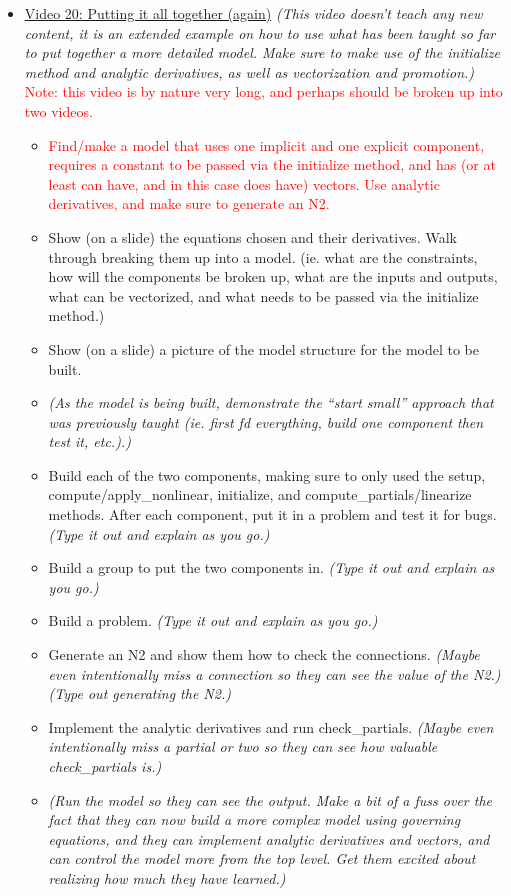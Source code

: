 \documentclass[12pt, letterpaper]{article}
\begin{document}
\begin{itemize}
	\item \underline{Video 20: Putting it all together (again)} \textit{(This video doesn’t teach any new content, it is an extended example on how to use what has been taught so far to put together a more detailed model. Make sure to make use of the initialize method and analytic derivatives, as well as vectorization and promotion.)} \textcolor{red}{Note: this video is by nature very long, and perhaps should be broken up into two videos.}
		\begin{itemize}
			\item \textcolor{red}{Find/make a model that uses one implicit and one explicit component, requires a constant to be passed via the initialize method, and has (or at least can have, and in this case does have) vectors. Use analytic derivatives, and make sure to generate an N2.}
			\item Show (on a slide) the equations chosen and their derivatives. Walk through breaking them up into a model. (ie. what are the constraints, how will the components be broken up, what are the inputs and outputs, what can be vectorized, and what needs to be passed via the initialize method.)
			\item Show (on a slide) a picture of the model structure for the model to be built.
			\item \textit{(As the model is being built, demonstrate the ``start small'' approach that was previously taught (ie. first fd everything, build one component then test it, etc.).)}
			\item Build each of the two components, making sure to only used the setup, compute/apply\_nonlinear, initialize, and compute\_partials/linearize methods. After each component, put it in a problem and test it for bugs. \textit{(Type it out and explain as you go.)}
			\item Build a group to put the two components in. \textit{(Type it out and explain as you go.)}
			\item Build a problem. \textit{(Type it out and explain as you go.)}
			\item Generate an N2 and show them how to check the connections. \textit{(Maybe even intentionally miss a connection so they can see the value of the N2.)} \textit{(Type out generating the N2.)}
			\item Implement the analytic derivatives and run check\_partials. \textit{(Maybe even intentionally miss a partial or two so they can see how valuable check\_partials is.)}
			\item \textit{(Run the model so they can see the output. Make a bit of a fuss over the fact that they can now build a more complex model using governing equations, and they can implement analytic derivatives and vectors, and can control the model more from the top level. Get them excited about realizing how much they have learned.)}

\end{itemize}
\end{itemize}
\end{document}
